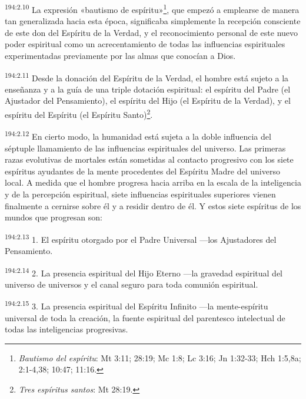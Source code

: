 \par
\textsuperscript{194:2.10} La expresión «bautismo de espíritu»\footnote{\textit{Bautismo del espíritu}: Mt 3:11; 28:19; Mc 1:8; Lc 3:16; Jn 1:32-33; Hch 1:5,8a; 2:1-4,38; 10:47; 11:16.}, que empezó a emplearse de manera tan generalizada hacia esta época, significaba simplemente la recepción consciente de este don del Espíritu de la Verdad, y el reconocimiento personal de este nuevo poder espiritual como un acrecentamiento de todas las influencias espirituales experimentadas previamente por las almas que conocían a Dios.

\par
\textsuperscript{194:2.11} Desde la donación del Espíritu de la Verdad, el hombre está sujeto a la enseñanza y a la guía de una triple dotación espiritual: el espíritu del Padre (el Ajustador del Pensamiento), el espíritu del Hijo (el Espíritu de la Verdad), y el espíritu del Espíritu (el Espíritu Santo)\footnote{\textit{Tres espíritus santos}: Mt 28:19.}.

\par
\textsuperscript{194:2.12} En cierto modo, la humanidad está sujeta a la doble influencia del séptuple llamamiento de las influencias espirituales del universo. Las primeras razas evolutivas de mortales están sometidas al contacto progresivo con los siete espíritus ayudantes de la mente procedentes del Espíritu Madre del universo local. A medida que el hombre progresa hacia arriba en la escala de la inteligencia y de la percepción espiritual, siete influencias espirituales superiores vienen finalmente a cernirse sobre él y a residir dentro de él. Y estos siete espíritus de los mundos que progresan son:

\par
\textsuperscript{194:2.13} 1. El espíritu otorgado por el Padre Universal ---los Ajustadores del Pensamiento.

\par
\textsuperscript{194:2.14} 2. La presencia espiritual del Hijo Eterno ---la gravedad espiritual del universo de universos y el canal seguro para toda comunión espiritual.

\par
\textsuperscript{194:2.15} 3. La presencia espiritual del Espíritu Infinito ---la mente-espíritu universal de toda la creación, la fuente espiritual del parentesco intelectual de todas las inteligencias progresivas.

